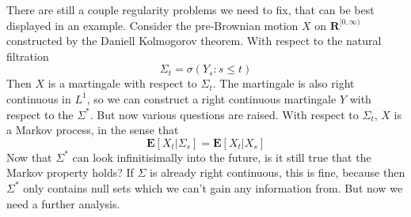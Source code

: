 There are still a couple regularity problems we need to fix, that can be best displayed in an example. Consider the pre-Brownian motion $X$ on $\mathbf{R}^{[0,\infty)}$ constructed by the Daniell Kolmogorov theorem. With respect to the natural filtration
%
\[ \Sigma_t = \sigma(Y_s: s \leq t) \]
%
Then $X$ is a martingale with respect to $\Sigma_t$. The martingale is also right continuous in $L^1$, so we can construct a right continuous martingale $Y$ with respect to the $\Sigma^*$. But now various questions are raised. With respect to $\Sigma_t$, $X$ is a Markov process, in the sense that
%
\[ \mathbf{E}[X_t|\Sigma_s] = \mathbf{E}[X_t|X_s] \]
%
Now that $\Sigma^*$ can look infinitisimally into the future, is it still true that the Markov property holds? If $\Sigma$ is already right continuous, this is fine, because then $\Sigma^*$ only contains null sets which we can't gain any information from. But now we need a further analysis.

